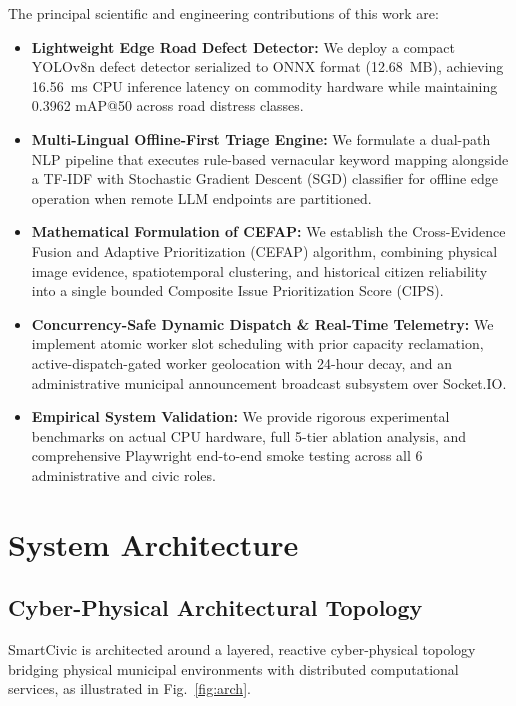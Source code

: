 \documentclass[conference]{IEEEtran}
\begin{document}
The principal scientific and engineering contributions of this work are:
\begin{itemize}
    \item \textbf{Lightweight Edge Road Defect Detector:} We deploy a compact YOLOv8n defect detector serialized to ONNX format (12.68~MB), achieving 16.56~ms CPU inference latency on commodity hardware while maintaining 0.3962 mAP@50 across road distress classes.
    \item \textbf{Multi-Lingual Offline-First Triage Engine:} We formulate a dual-path NLP pipeline that executes rule-based vernacular keyword mapping alongside a TF-IDF with Stochastic Gradient Descent (SGD) classifier for offline edge operation when remote LLM endpoints are partitioned.
    \item \textbf{Mathematical Formulation of CEFAP:} We establish the Cross-Evidence Fusion and Adaptive Prioritization (CEFAP) algorithm, combining physical image evidence, spatiotemporal clustering, and historical citizen reliability into a single bounded Composite Issue Prioritization Score (CIPS).
    \item \textbf{Concurrency-Safe Dynamic Dispatch \& Real-Time Telemetry:} We implement atomic worker slot scheduling with prior capacity reclamation, active-dispatch-gated worker geolocation with 24-hour decay, and an administrative municipal announcement broadcast subsystem over Socket.IO.
    \item \textbf{Empirical System Validation:} We provide rigorous experimental benchmarks on actual CPU hardware, full 5-tier ablation analysis, and comprehensive Playwright end-to-end smoke testing across all 6 administrative and civic roles.
\end{itemize}

\section{System Architecture}
\label{sec:architecture}

\subsection{Cyber-Physical Architectural Topology}
SmartCivic is architected around a layered, reactive cyber-physical topology bridging physical municipal environments with distributed computational services, as illustrated in Fig.~\ref{fig:arch}.
\end{document}
